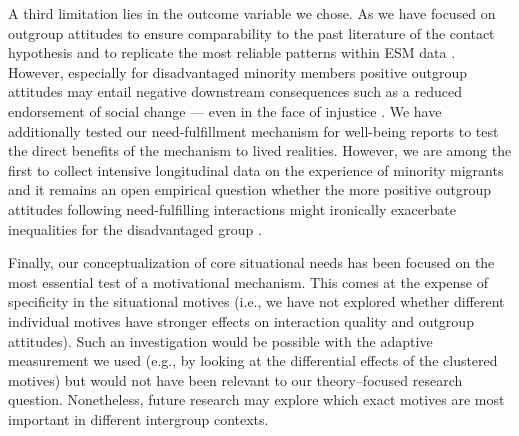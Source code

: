 \documentclass[man, 12pt, a4paper, mask]{apa7}
\theoremstyle{break}
\theoremstyle{plain}
\begin{document}
A third limitation lies in the outcome variable we chose. As we have focused on outgroup attitudes to ensure comparability to the past literature of the contact hypothesis and to replicate the most reliable patterns within ESM data \citep[][]{Pettigrew2006}. However, especially for disadvantaged minority members positive outgroup attitudes may entail negative downstream consequences such as a reduced endorsement of social change --- even in the face of injustice \citep[e.g.,][]{dixon2012}. We have additionally tested our need-fulfillment mechanism for well-being reports to test the direct benefits of the mechanism to lived realities. However, we are among the first to collect intensive longitudinal data on the experience of minority migrants and it remains an open empirical question whether the more positive outgroup attitudes following need-fulfilling interactions might ironically exacerbate inequalities for the disadvantaged group \citep[also see][]{reimer2023}. 

Finally, our conceptualization of core situational needs has been focused on the most essential test of a motivational mechanism. This comes at the expense of specificity in the situational motives (i.e., we have not explored whether different individual motives have stronger effects on interaction quality and outgroup attitudes). Such an investigation would be possible with the adaptive measurement we used (e.g., by looking at the differential effects of the clustered motives) but would not have been relevant to our theory–focused research question. Nonetheless, future research may explore which exact motives are most important in different intergroup contexts. 
\end{document}
